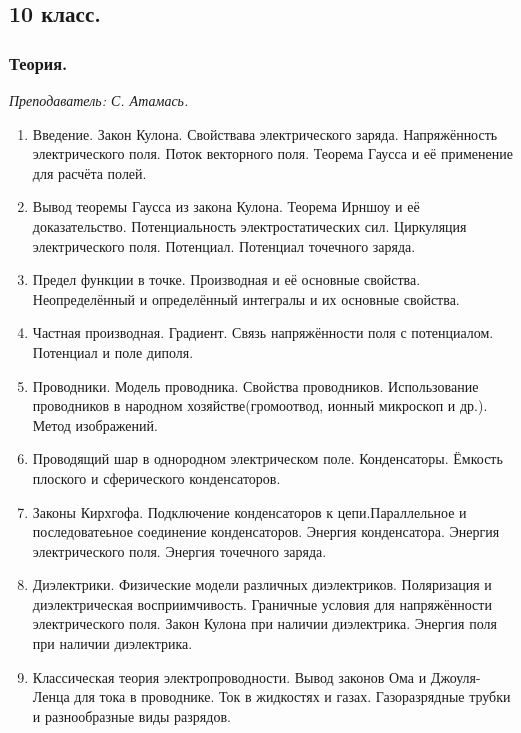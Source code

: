 \documentclass[11pt]{article}
\newlength{\h}
\newlength{\x}
\begin{document}
\subsection{10 класс.}
\label{sec:daily10}

\subsubsection{Теория.}
\label{sec:th10}

\textit{Преподаватель: С. Атамась.}\\

\begin{enumerate}
\item Введение. Закон Кулона. Свойствава электрического
  заряда. Напряжённость электрического поля. Поток векторного
  поля. Теорема Гаусса и её применение для расчёта полей.
\item Вывод теоремы Гаусса из закона Кулона. Теорема Ирншоу и её
  доказательство. Потенциальность электростатических сил. Циркуляция
  электрического поля. Потенциал. Потенциал точечного заряда.
\item Предел функции в точке. Производная и её основные
  свойства. Неопределённый и определённый интегралы и их основные
  свойства.
\item Частная производная. Градиент. Связь напряжённости поля с
  потенциалом. Потенциал и поле диполя.
\item Проводники. Модель проводника. Свойства
  проводников. Использование проводников в народном
  хозяйстве(громоотвод, ионный микроскоп и др.). Метод изображений.
\item Проводящий шар в однородном электрическом
  поле. Конденсаторы. Ёмкость плоского и сферического конденсаторов.
\item Законы Кирхгофа. Подключение конденсаторов к цепи.Параллельное и
  последоватеьное соединение конденсаторов. Энергия
  конденсатора. Энергия электрического поля. Энергия точечного заряда.
\item Диэлектрики. Физические модели различных
  диэлектриков. Поляризация и диэлектрическая
  восприимчивость. Граничные условия для напряжённости электрического
  поля. Закон Кулона при наличии диэлектрика. Энергия поля при наличии
  диэлектрика.
\item Классическая теория электропроводности. Вывод законов Ома и
  Джоуля-Ленца для тока в проводнике. Ток в жидкостях и
  газах. Газоразрядные трубки и разнообразные виды разрядов.
\end{enumerate}
\end{document}
